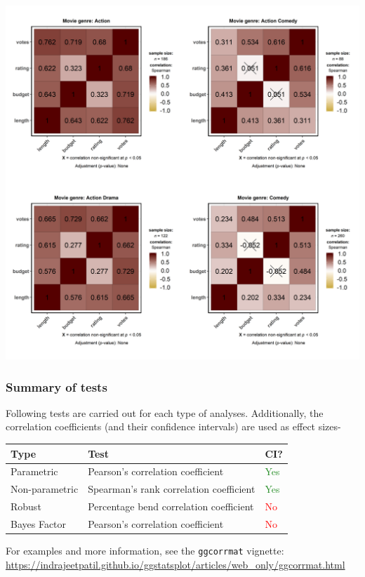\documentclass[
]{article}
\begin{document}
\includegraphics[width=1\linewidth]{./figures/paper-ggcorrmat3-1}

\hypertarget{summary-of-tests-7}{%
\subsubsection{Summary of tests}\label{summary-of-tests-7}}

Following tests are carried out for each type of analyses. Additionally, the
correlation coefficients (and their confidence intervals) are used as effect
sizes-

\begin{longtable}[]{@{}lll@{}}
\toprule
Type & Test & CI?\tabularnewline
\midrule
\endhead
Parametric & Pearson's correlation coefficient & \textcolor{ForestGreen}{Yes}\tabularnewline
Non-parametric & Spearman's rank correlation coefficient & \textcolor{ForestGreen}{Yes}\tabularnewline
Robust & Percentage bend correlation coefficient & \textcolor{red}{No}\tabularnewline
Bayes Factor & Pearson's correlation coefficient & \textcolor{red}{No}\tabularnewline
\bottomrule
\end{longtable}

For examples and more information, see the \texttt{ggcorrmat} vignette:
\url{https://indrajeetpatil.github.io/ggstatsplot/articles/web_only/ggcorrmat.html}
\end{document}
